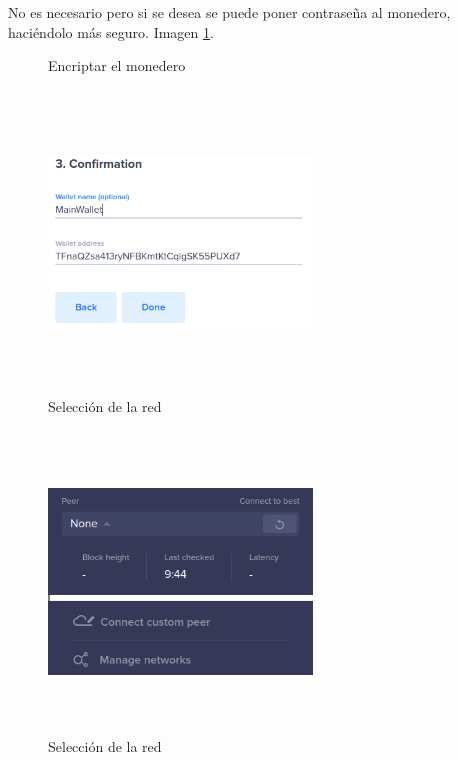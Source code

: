 No es necesario pero si se desea se puede poner contraseña al monedero, haciéndolo más seguro. Imagen \ref{fig:wallet-9}.

\begin{figure}[h]
	\centering
	\caption{Encriptar el monedero}
	\label{fig:wallet-9}
\end{figure}



\begin{figure}[h]
	\centering
	\includegraphics[width=7cm,height=8cm]{figuras/wallet_10.png}
	\caption{Selección de la red}
	\label{fig:wallet-10}
\end{figure}

\begin{figure}[h]
	\centering
	\includegraphics[width=7cm,height=8cm]{figuras/wallet_11.png}
	\caption{Selección de la red}
	\label{fig:wallet-11}
\end{figure}

